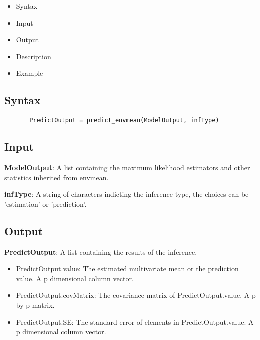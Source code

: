 \documentclass[a4paper,11pt,openany]{memoir}
\begin{document}
\begin{itemize}
\setlength{\itemsep}{-1ex}
   \item Syntax
   \item Input
   \item Output
   \item Description
   \item Example
\end{itemize}


\subsection*{Syntax}


\begin{verbatim}       PredictOutput = predict_envmean(ModelOutput, infType)\end{verbatim}
    

\subsection*{Input}

\begin{par}
\textbf{ModelOutput}: A list containing the maximum likelihood estimators and other statistics inherited from envmean.
\end{par} \vspace{1em}
\begin{par}
\textbf{infType}: A string of characters indicting the inference type, the choices can be 'estimation' or 'prediction'.
\end{par} \vspace{1em}


\subsection*{Output}

\begin{par}
\textbf{PredictOutput}: A list containing the results of the inference.
\end{par} \vspace{1em}
\begin{itemize}
\setlength{\itemsep}{-1ex}
   \item PredictOutput.value: The estimated multivariate mean or the prediction value. A p dimensional column vector.
   \item PredictOutput.covMatrix: The covariance matrix of PredictOutput.value. A p by p matrix.
   \item PredictOutput.SE: The standard error of elements in PredictOutput.value.  A p dimensional column vector.
\end{itemize}
\end{document}
